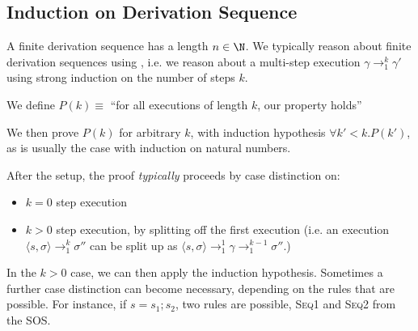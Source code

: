 \subsection{Induction on Derivation Sequence}
A finite derivation sequence has a length $n \in \N$.
We typically reason about finite derivation sequences using ,
i.e. we reason about a multi-step execution $\gamma \rightarrow_1^k \gamma'$ using strong induction on the number of steps $k$.

We define $P(k) \equiv$ ``for all executions of length $k$, our property holds''

We then prove $P(k)$ for arbitrary $k$, with induction hypothesis $\forall k' < k. P(k')$, as is usually the case with induction on natural numbers.

After the setup, the proof \textit{typically} proceeds by case distinction on:
\begin{itemize}
    \item $k = 0$ step execution
    \item $k > 0$ step execution, by splitting off the first execution (i.e. an execution $\langle s, \sigma \rangle \rightarrow_1^k \sigma''$
        can be split up as $\langle s, \sigma \rangle \rightarrow_1^1 \gamma \rightarrow_1^{k - 1} \sigma''$.)
\end{itemize}
In the $k > 0$ case, we can then apply the induction hypothesis. Sometimes a further case distinction can become necessary, depending on the rules that are possible.
For instance, if $s = s_1; s_2$, two rules are possible, \textsc{Seq1} and \textsc{Seq2} from the SOS.
